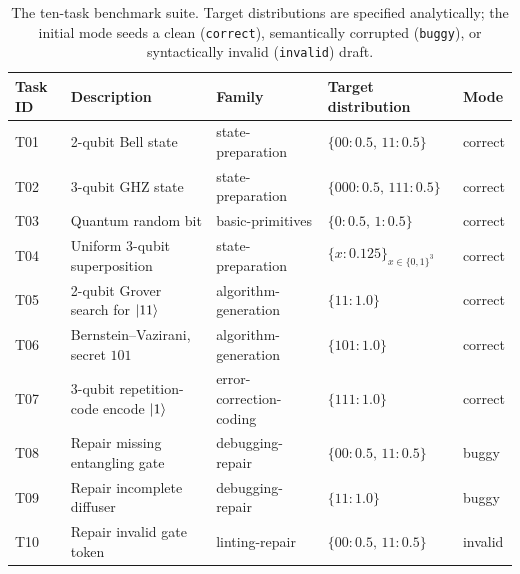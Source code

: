 \documentclass[11pt,a4paper]{article}
\newcounter{algo}
\begin{document}
\begin{table}[H]
\centering
\caption{The ten-task benchmark suite. Target distributions are specified analytically; the initial mode seeds a clean (\texttt{correct}), semantically corrupted (\texttt{buggy}), or syntactically invalid (\texttt{invalid}) draft.}
\label{tab:tasks}
\setlength{\tabcolsep}{4pt}\small
\begin{tabular}{@{}p{2.05cm}p{3.5cm}p{2.4cm}p{2.8cm}p{1.4cm}@{}}
\toprule
\textbf{Task ID} & \textbf{Description} & \textbf{Family} & \textbf{Target distribution} & \textbf{Mode} \\
\midrule
T01 & 2-qubit Bell state & state-preparation & $\{00\!:\!0.5,\,11\!:\!0.5\}$ & correct \\
T02 & 3-qubit GHZ state & state-preparation & $\{000\!:\!0.5,\,111\!:\!0.5\}$ & correct \\
T03 & Quantum random bit & basic-primitives & $\{0\!:\!0.5,\,1\!:\!0.5\}$ & correct \\
T04 & Uniform 3-qubit superposition & state-preparation & $\{x\!:\!0.125\}_{x\in\{0,1\}^3}$ & correct \\
T05 & 2-qubit Grover search for $\ket{11}$ & algorithm-generation & $\{11\!:\!1.0\}$ & correct \\
T06 & Bernstein--Vazirani, secret $101$ & algorithm-generation & $\{101\!:\!1.0\}$ & correct \\
T07 & 3-qubit repetition-code encode $\ket{1}$ & error-correction-coding & $\{111\!:\!1.0\}$ & correct \\
T08 & Repair missing entangling gate & debugging-repair & $\{00\!:\!0.5,\,11\!:\!0.5\}$ & buggy \\
T09 & Repair incomplete diffuser & debugging-repair & $\{11\!:\!1.0\}$ & buggy \\
T10 & Repair invalid gate token & linting-repair & $\{00\!:\!0.5,\,11\!:\!0.5\}$ & invalid \\
\bottomrule
\end{tabular}
\end{table}
\end{document}
